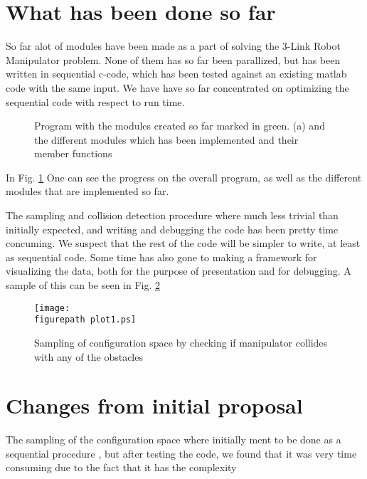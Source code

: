 \newcommand{\figurepath}{./figures/}
\newcommand{\figurescale}{0.23}
\newcommand{\codepath}{../matlab/}
\setlength\parindent{24pt}


\section*{What has been done so far}

So far alot of modules have been made as a part of solving the 3-Link Robot Manipulator problem. None of them has so far been parallized, but has been written in sequential c-code, which has been tested against an existing matlab code with the same input. We have have so far concentrated on optimizing the sequential code with respect to run time. 

\begin{figure}[h!] 
 \center 
 \caption{  Program with the modules created so far marked in green. (a) and the different modules which has been implemented and their member functions \label{fig:prog1}}
 \end{figure}

In Fig. \ref{fig:prog1} One can see the progress on the overall program, as well as the different modules that are implemented so far. 

The sampling and collision detection procedure where much less trivial than initially expected, and writing and debugging the code has been pretty time concuming. We suspect that the rest of the code will be simpler to write, at least as sequential code. Some time has also gone to making a framework for visualizing the data, both for the purpose of presentation and for debugging. A sample of this can be seen in Fig. \ref{fig:plot1} 

\begin{figure}[h!] 
 \center 
 \texttt{[image: \\figurepath plot1.ps]}
 \caption{ Sampling of configuration space by checking if manipulator collides with any of the obstacles \label{fig:plot1}}
 \end{figure}


\section*{Changes from initial proposal}

The sampling of the configuration space where initially ment to be done as a sequential procedure , but after testing the code, we found that it was very time consuming due to the fact that  it has the complexity 

